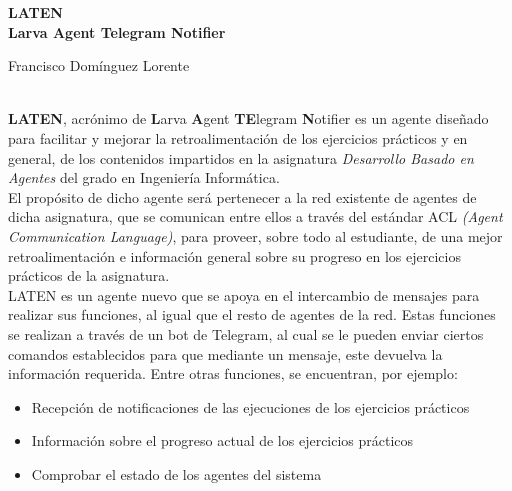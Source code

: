 \thispagestyle{empty}

\begin{center}
	{\large\bfseries LATEN \\ Larva Agent Telegram Notifier }\\
\end{center}
\begin{center}
	Francisco Domínguez Lorente\\
\end{center}


\vspace{0.5cm}
\vspace{0.7cm}

\\
	\textbf{LATEN}, acrónimo de \textbf{L}arva \textbf{A}gent \textbf{TE}legram \textbf{N}otifier es un agente diseñado para facilitar y mejorar la retroalimentación
	de los ejercicios prácticos y en general, de los contenidos impartidos en la asignatura \textit{Desarrollo Basado en Agentes} del grado en Ingeniería Informática.\\

	El propósito de dicho agente será pertenecer a la red existente de agentes de dicha asignatura, que se comunican entre ellos a través del estándar ACL \textit{(Agent Communication Language)},
	para proveer, sobre todo al estudiante, de una mejor retroalimentación e información general sobre su progreso en los ejercicios prácticos de la asignatura.\\

	LATEN es un agente nuevo que se apoya en el intercambio de mensajes para realizar sus funciones, al igual que el resto de agentes de la red. Estas funciones se realizan a través de un
	bot de Telegram, al cual se le pueden enviar ciertos comandos establecidos para que mediante un mensaje, este devuelva la información requerida. Entre otras funciones, se encuentran, por ejemplo:
    
	\begin{itemize}
		\item Recepción de notificaciones de las ejecuciones de los ejercicios prácticos
		\item Información sobre el progreso actual de los ejercicios prácticos
		\item Comprobar el estado de los agentes del sistema
	\end{itemize}
    
